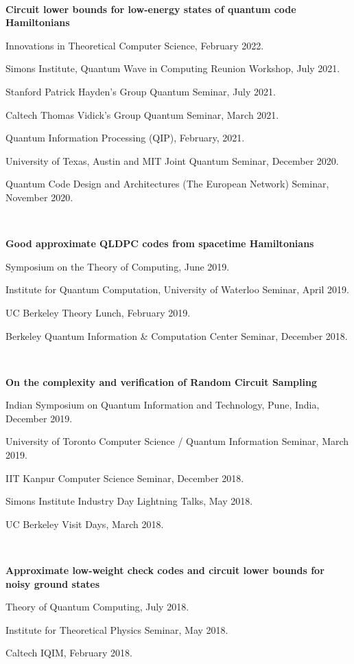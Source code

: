 \documentclass{article}
\begin{document}
\

\textbf{Circuit lower bounds for low-energy states of quantum code Hamiltonians}

Innovations in Theoretical Computer Science, February 2022.

Simons Institute, Quantum Wave in Computing Reunion Workshop, July 2021.

Stanford Patrick Hayden's Group Quantum Seminar, July 2021.

Caltech Thomas Vidick's Group Quantum Seminar, March 2021.

Quantum Information Processing (QIP), February, 2021.

University of Texas, Austin and MIT Joint Quantum Seminar, December 2020. 

Quantum Code Design and Architectures (The European Network) Seminar, November 2020.

\

\textbf{Good approximate QLDPC codes from spacetime Hamiltonians}

Symposium on the Theory of Computing, June 2019.

Institute for Quantum Computation, University of Waterloo Seminar, April 2019.

UC Berkeley Theory Lunch, February 2019.

Berkeley Quantum Information \& Computation Center Seminar, December 2018.

\

\textbf{On the complexity and verification of Random Circuit Sampling}

Indian Symposium on Quantum Information and Technology, Pune, India, December 2019.

University of Toronto Computer Science / Quantum Information Seminar, March 2019.

IIT Kanpur Computer Science Seminar, December 2018.

Simons Institute Industry Day Lightning Talks, May 2018.

UC Berkeley Visit Days, March 2018.

\

\textbf{Approximate low-weight check codes and circuit lower bounds for noisy ground states}

Theory of Quantum Computing, July 2018.

Institute for Theoretical Physics Seminar, May 2018.

Caltech IQIM, February 2018.

\
\end{document}
